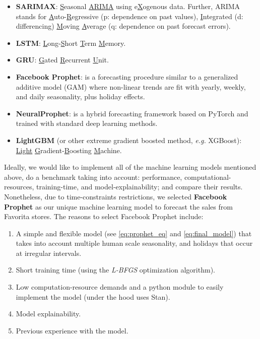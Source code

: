 \begin{itemize}
\item \textbf{SARIMAX}: \underline{S}easonal \underline{ARIMA} using e\underline{X}ogenous data. Further, ARIMA stands for \underline{A}uto-\underline{R}egressive (p: dependence on past values), \underline{I}ntegrated (d: differencing) \underline{M}oving \underline{A}verage (q: dependence on past forecast errors). 
\item \textbf{LSTM}\autocite{hochreiter1997long}: \underline{L}ong-\underline{S}hort \underline{T}erm \underline{M}emory.
\item \textbf{GRU}\autocite{cho2014learning}: \underline{G}ated \underline{R}ecurrent \underline{U}nit.
\item \textbf{Facebook Prophet}\autocite{taylor2018forecasting}: is a forecasting procedure similar to a generalized additive model\autocite{hastie1987generalized} (GAM) where non-linear trends are fit with yearly, weekly, and daily seasonality, plus holiday effects.
\item \textbf{NeuralProphet}\autocite{triebe2021neuralprophet}: is a hybrid forecasting framework based on PyTorch and trained with standard deep learning methods.
\item \textbf{LightGBM}\autocite{ke2017lightgbm} (or other extreme gradient boosted method, \textit{e.g.} XGBoost): \underline{Light} \underline{G}radient-\underline{B}oosting \underline{M}achine.
\end{itemize}


Ideally, we would like to implement all of the  machine learning models mentioned above, do a benchmark taking into account: performance, computational-resources, training-time, and model-explainability; and compare their results. Nonetheless, due to time-constraints restrictions, we selected \textbf{Facebook Prophet} as our unique machine learning model to forecast the sales from Favorita stores. The reasons to select Facebook Prophet include:

\begin{enumerate}
\item A simple and flexible model (see \autoref{eq:prophet_eq} and  \autoref{eq:final_model}) that takes into account multiple human scale seasonality, and holidays that occur at irregular intervals.
\item Short training time (using the \textit{L-BFGS}  optimization algorithm\autocite{byrd1995limited}).
\item Low computation-resource demands and a python module to easily implement the model (under the hood uses Stan\autocite{carpenter2017stan}).
\item Model explainability.
\item Previous experience with the model.
\end{enumerate} 

